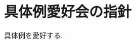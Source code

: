 \documentclass[uplatex, dvipdfmx, a4paper, 12pt, class=jsbook, crop=false]{standalone}
\begin{document}
\chapter*{具体例愛好会の指針}
具体例を愛好する.
\end{document}
